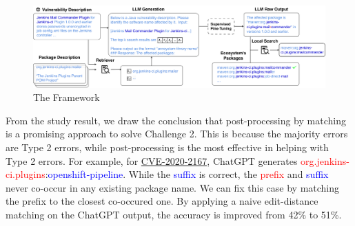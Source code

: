 \begin{figure}[t]
\centering
\includegraphics[width=1\linewidth]{figures/workflow-v3.drawio.pdf}
\caption{The \detector{} Framework}
\label{fig: framework}
\vspace{-0.3cm}
\end{figure}

From the study result, we draw the conclusion that post-processing by matching is a promising approach to solve Challenge 2. This is because the majority errors are Type 2 errors, while post-processing is the most effective in helping with Type 2 errors. For example, for \href{https://github.com/advisories/GHSA-264w-xrr7-6qqg}{CVE-2020-2167}, ChatGPT generates \textcolor{Red}{org.jenkins-ci.plugins}:\textcolor{Blue}{openshift-pipeline}. While the \textcolor{Blue}{suffix} is correct, the \textcolor{Red}{prefix} and \textcolor{Blue}{suffix} never co-occur in any existing package name. We can fix this case by matching the prefix to the closest co-occured one. 
By applying a naive edit-distance matching on the ChatGPT output, the accuracy is improved from 42\% to 51\%. 




